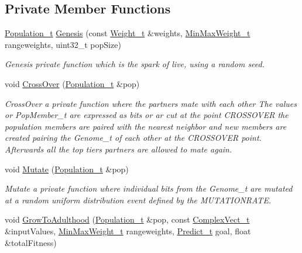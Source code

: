 \subsection*{Private Member Functions}
\begin{DoxyCompactItemize}
\item 
\hyperlink{_soil_math_types_8h_a8d2d4c736cf817d048a2d66dec8b12ec}{Population\+\_\+t} \hyperlink{class_soil_math_1_1_g_a_a96cfe7cc5b3028a66b0136e72ea38cbc}{Genesis} (const \hyperlink{_soil_math_types_8h_ac56ad2b88186620fd0de0d213aa715dd}{Weight\+\_\+t} \&weights, \hyperlink{_soil_math_types_8h_aaa919636507bcd52b19efa301aa80b9a}{Min\+Max\+Weight\+\_\+t} rangeweights, uint32\+\_\+t pop\+Size)
\begin{DoxyCompactList}\small\item\em Genesis private function which is the spark of live, using a random seed. \end{DoxyCompactList}\item 
void \hyperlink{class_soil_math_1_1_g_a_abf408d603b2afb188a6d265eb6309b69}{Cross\+Over} (\hyperlink{_soil_math_types_8h_a8d2d4c736cf817d048a2d66dec8b12ec}{Population\+\_\+t} \&pop)
\begin{DoxyCompactList}\small\item\em Cross\+Over a private function where the partners mate with each other The values or Pop\+Member\+\_\+t are expressed as bits or ar cut at the point C\+R\+O\+S\+S\+O\+V\+E\+R the population members are paired with the nearest neighbor and new members are created pairing the Genome\+\_\+t of each other at the C\+R\+O\+S\+S\+O\+V\+E\+R point. Afterwards all the top tiers partners are allowed to mate again. \end{DoxyCompactList}\item 
void \hyperlink{class_soil_math_1_1_g_a_a489f2afd54086c14f45b654aeec0fe3c}{Mutate} (\hyperlink{_soil_math_types_8h_a8d2d4c736cf817d048a2d66dec8b12ec}{Population\+\_\+t} \&pop)
\begin{DoxyCompactList}\small\item\em Mutate a private function where individual bits from the Genome\+\_\+t are mutated at a random uniform distribution event defined by the M\+U\+T\+A\+T\+I\+O\+N\+R\+A\+T\+E. \end{DoxyCompactList}\item 
void \hyperlink{class_soil_math_1_1_g_a_aff791f50f889beb74e854942f8883b58}{Grow\+To\+Adulthood} (\hyperlink{_soil_math_types_8h_a8d2d4c736cf817d048a2d66dec8b12ec}{Population\+\_\+t} \&pop, const \hyperlink{_soil_math_types_8h_a7567e521c2b2c408dcb62dbff72390f7}{Complex\+Vect\+\_\+t} \&input\+Values, \hyperlink{_soil_math_types_8h_aaa919636507bcd52b19efa301aa80b9a}{Min\+Max\+Weight\+\_\+t} rangeweights, \hyperlink{_soil_math_types_8h_aaeba766195a440b2539f0438d3d41f95}{Predict\+\_\+t} goal, float \&total\+Fitness)

\end{DoxyCompactItemize}

